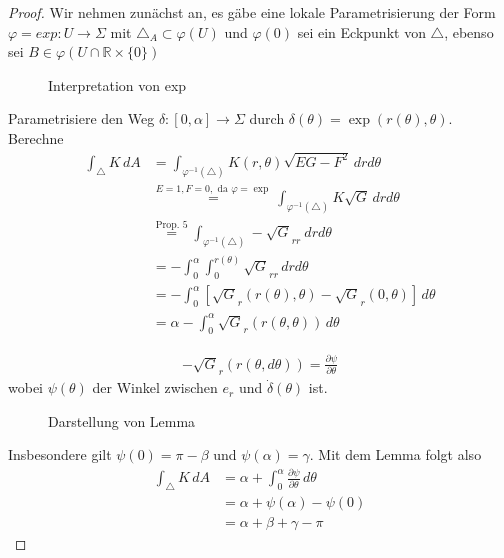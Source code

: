 \documentclass[../main.tex]{subfiles}
\begin{document}
\begin{proof}
    Wir nehmen zunächst an, es gäbe eine lokale Parametrisierung der Form
    \(\varphi = exp : U \to \Sigma\) mit \(\triangle_A \subset \varphi(U)\)
    und \(\varphi(0)\) sei ein Eckpunkt von $\triangle$, ebenso sei $B \in \varphi (U\cap \mathbb{R} \times \{0\})$
    
    \begin{figure}[htb]
        \centering
        \def\svgwidth{40em}
        
        \caption{Interpretation von exp}        
    \end{figure}


Parametrisiere den Weg $\delta : [0,\alpha] \to \Sigma$ durch $\delta(\theta) = \exp(r(\theta), \theta)$. Berechne
\begin{align*}
    \int_{\triangle} K \,dA & = \int_{\varphi^{-1}(\triangle)} K(r,\theta) \sqrt{EG-F^{2}}\,drd\theta \\
    & \overset{E=1, F=0, \text{ da } \varphi = \exp}{=}\int_{\varphi^{-1}(\triangle)} K\sqrt{G}  \,drd\theta \\ 
    & \overset{\text{Prop. 5}}{=} \int_{\varphi^{-1}(\triangle)} -\sqrt{G}_{rr} \ drd\theta \\
    & = - \int_{0}^{\alpha} \int_{0}^{r(\theta)} \sqrt{G}_{rr}\,drd\theta \\
    & = - \int_{0}^{\alpha} \left [\sqrt{G}_r (r(\theta), \theta) - \sqrt{G}_r(0,\theta) \right ] \,d\theta \\
    & = \alpha - \int_{0}^{\alpha} \sqrt{G}_r (r(\theta,\theta))  \,d\theta 
\end{align*}

\begin{lemma*}
    \begin{align*}
        -\sqrt{G}_r (r(\theta, d\theta)) = \frac{\partial \psi}{\partial \theta}
    \end{align*} wobei $\psi(\theta)$ der Winkel zwischen $e_r$ und $\dot{\delta}(\theta)$ ist.
\end{lemma*}

\begin{figure}[htb]
    \centering
    \def\svgwidth{20em}
    
    \caption{Darstellung von Lemma}        
\end{figure}

Insbesondere gilt $\psi (0) = \pi - \beta $ und $\psi (\alpha) = \gamma$. Mit dem Lemma folgt also
\begin{align*}
    \int_{\triangle} K  \,dA &= \alpha + \int_{0}^{\alpha} \frac{\partial \psi}{\partial \theta} \,d\theta \\
    &= \alpha + \psi(\alpha) - \psi(0) \\
    &= \alpha + \beta + \gamma - \pi
\end{align*}
\end{proof}
\end{document}
